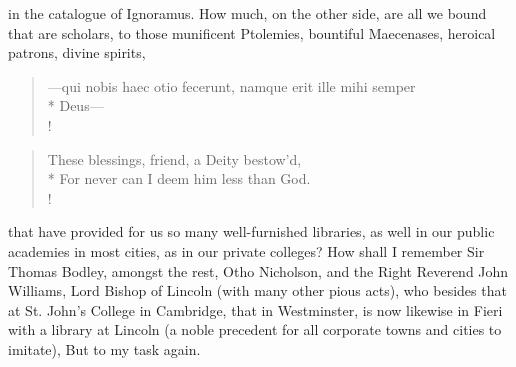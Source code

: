 {in the catalogue of Ignoramus. How much, on the other side, are all we
bound that are scholars, to those munificent Ptolemies, bountiful
Maecenases, heroical patrons, divine spirits,
%
%
\begin{latin}%
\begin{verse}%
---qui nobis haec otio fecerunt, namque erit ille mihi semper\\*
Deus---\\!
\end{verse}%
\end{latin}%
\translationrule%
\begin{verse}%
These blessings, friend, a Deity bestow'd,\\*
For never can I deem him less than God.\\!
\end{verse}%
%
that have provided for us so many well-furnished libraries, as well in
our public academies in most cities, as in our private colleges? How
shall I remember Sir Thomas Bodley, amongst the rest, Otho
Nicholson, and the Right Reverend John Williams, Lord Bishop of Lincoln
(with many other pious acts), who besides that at St. John's College in
Cambridge, that in Westminster, is now likewise in Fieri with a library
at Lincoln (a noble precedent for all corporate towns and cities to
imitate),  But to
my task again.

}
